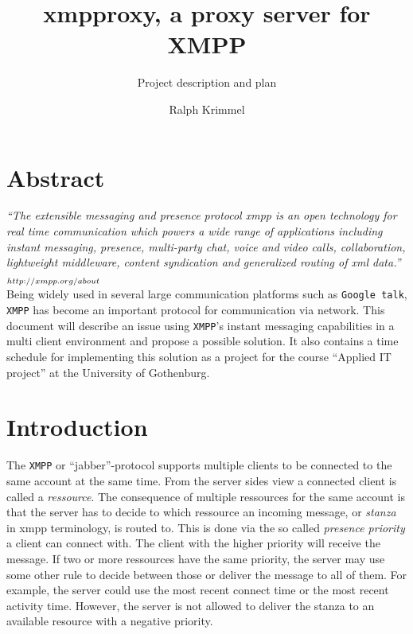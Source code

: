 \documentclass[a4paper,10pt,numbers=noendperiod]{scrartcl}
\author{Ralph Krimmel}
\title{xmpproxy, a proxy server for XMPP}
\subtitle{ Project description and plan }
\begin{document}
\maketitle{}
\thispagestyle{empty}
\newpage
\tableofcontents{}
\newpage
\section{Abstract}
\textit{``The extensible messaging and presence protocol xmpp is an open technology 
for real time communication which powers a wide range of applications including instant messaging, 
presence, multi-party chat, voice and video calls, collaboration, lightweight middleware, 
content syndication and generalized routing of xml data.''}   $_{\tiny http://xmpp.org/about}$ \\

Being widely used in several large communication platforms such as \texttt{Google talk},  %
\texttt{XMPP} has become an important protocol for communication via network. This document will describe an 
issue using \texttt{XMPP}'s instant messaging capabilities in a multi client environment and propose a possible solution.
It also contains a time schedule for implementing this solution as a project for the course ``Applied IT project'' at the University 
of Gothenburg.

\section{Introduction}
The \texttt{XMPP} or ``jabber''-protocol supports multiple clients to be connected to the same account at the same time. From the server sides view a connected client is called a \textit{ressource}. The consequence of multiple ressources for the same account is that the server has to decide to which ressource an incoming message, or \textit{stanza} in xmpp terminology, is routed to. This is done via the so called \textit{presence priority} a client can connect with.  The client with the higher priority will receive the message. 
If two or more ressources have the same priority, the server may use some other rule to decide between those or deliver the message to all of them. For example, the server could use the most recent connect time or the most recent activity time. However, the server is not allowed to deliver the stanza to an available resource with a negative priority. %
\end{document}
